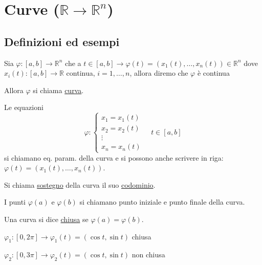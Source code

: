 
\section{Curve (\texorpdfstring{$\mathbb{R} \to \mathbb{R}^n$}{R to R n})}

\subsection{Definizioni ed esempi}

\begin{definition}
Sia $\varphi : [a, b] \to \mathbb{R}^n$ che a $t \in [a, b] \to \varphi(t) = (x_1(t), \dots, x_n(t)) \in \mathbb{R}^n$ dove $x_i(t) : [a, b] \to \mathbb{R}$ continua, $i = 1, \dots, n$, allora diremo che $\varphi$ è continua 

Allora $\varphi$ si chiama \underline{curva}.
\end{definition}

Le equazioni
\[
\varphi : \begin{cases}
x_1 = x_1(t) \\
x_2 = x_2(t) \\
\vdots \\
x_n = x_n(t)
\end{cases} \quad t \in [a, b]
\]
si chiamano eq. param. della curva e si possono anche scrivere in riga: $\varphi(t) = (x_1(t), \dots, x_n(t))$.

Si chiama \underline{sostegno} della curva il suo \underline{codominio}.

I punti $\varphi(a)$ e $\varphi(b)$ si chiamano punto iniziale e punto finale della curva.

Una curva si dice \underline{chiusa} se $\varphi(a) = \varphi(b)$.

\begin{example}
$\varphi_1 : [0, 2\pi] \to \varphi_1(t) = (\cos t, \sin t)$ chiusa

$\varphi_2 : [0, 3\pi] \to \varphi_2(t) = (\cos t, \sin t)$ non chiusa

\begin{center}
\end{center}
\end{example}

